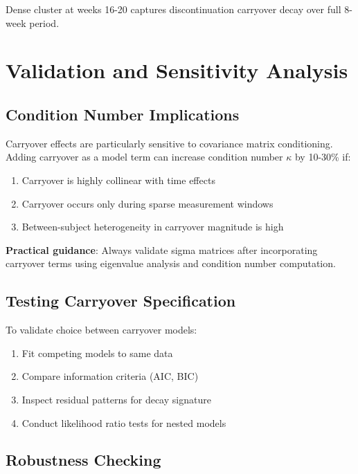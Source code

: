 \documentclass[11pt,a4paper]{article}
\begin{document}
Dense cluster at weeks 16-20 captures discontinuation carryover decay over full 8-week period.

\section{Validation and Sensitivity Analysis}
\label{sec:validation}

\subsection{Condition Number Implications}

Carryover effects are particularly sensitive to covariance matrix conditioning. Adding carryover as a model term can increase condition number $\kappa$ by 10-30\% if:

\begin{enumerate}
  \item Carryover is highly collinear with time effects
  \item Carryover occurs only during sparse measurement windows
  \item Between-subject heterogeneity in carryover magnitude is high
\end{enumerate}

\textbf{Practical guidance}: Always validate sigma matrices after incorporating carryover terms using eigenvalue analysis and condition number computation.

\subsection{Testing Carryover Specification}

To validate choice between carryover models:

\begin{enumerate}
  \item Fit competing models to same data
  \item Compare information criteria (AIC, BIC)
  \item Inspect residual patterns for decay signature
  \item Conduct likelihood ratio tests for nested models
\end{enumerate}

\subsection{Robustness Checking}
\end{document}
